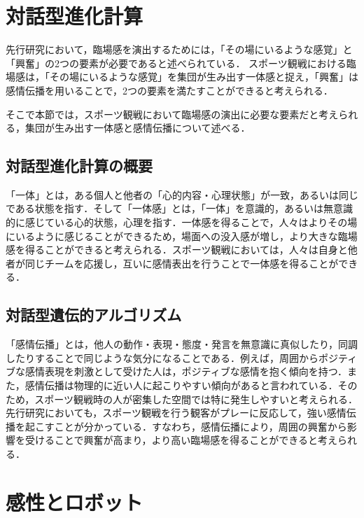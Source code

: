 \newpage

\section{対話型進化計算}
\label{sec2.2}

先行研究において，臨場感を演出するためには，「その場にいるような感覚」と「興奮」の2つの要素が必要であると述べられている．
スポーツ観戦における臨場感は，「その場にいるような感覚」を集団が生み出す一体感と捉え，「興奮」は感情伝播を用いることで，2つの要素を満たすことができると考えられる．

そこで本節では，スポーツ観戦において臨場感の演出に必要な要素だと考えられる，集団が生み出す一体感と感情伝播について述べる．

\subsection{対話型進化計算の概要}
\label{sec2.2.1}

「一体」とは，ある個人と他者の「心的内容・心理状態」が一致，あるいは同じである状態を指す．そして「一体感」とは，「一体」を意識的，あるいは無意識的に感じている心的状態，心理を指す\cite{ittai}．一体感を得ることで，人々はよりその場にいるように感じることができるため，場面への没入感が増し，より大きな臨場感を得ることができると考えられる．スポーツ観戦においては，人々は自身と他者が同じチームを応援し，互いに感情表出を行うことで一体感を得ることができる．
    
\subsection{対話型遺伝的アルゴリズム}
\label{sec2.2.2}

「感情伝播」とは，他人の動作・表現・態度・発言を無意識に真似したり，同調したりすることで同じような気分になることである\cite{denpa}．例えば，周囲からポジティブな感情表現を刺激として受けた人は，ポジティブな感情を抱く傾向を持つ．また，感情伝播は物理的に近い人に起こりやすい傾向があると言われている．そのため，スポーツ観戦時の人が密集した空間では特に発生しやすいと考えられる．先行研究においても，スポーツ観戦を行う観客がプレーに反応して，強い感情伝播を起こすことが分かっている\cite{jyodo}．すなわち，感情伝播により，周囲の興奮から影響を受けることで興奮が高まり，より高い臨場感を得ることができると考えられる．

\newpage

\section{感性とロボット}
\label{sec2.3}

